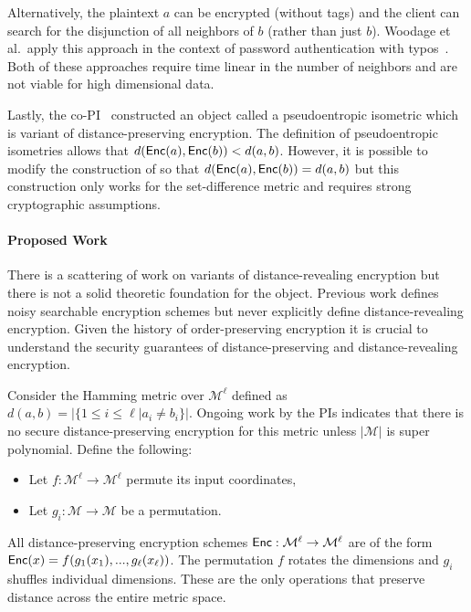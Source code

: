 Alternatively, the plaintext $a$ can be encrypted (without tags) and the client can search for the disjunction of all neighbors of $b$ (rather than just $b$).  Woodage et al.~apply this approach in the context of password authentication with typos~\cite{C:WCDJR17}.  Both of these approaches require time linear in the number of neighbors and are not viable for high dimensional data.

Lastly, the co-PI~\cite{EPRINT:ABCFG16} constructed an object called a pseudoentropic isometric which is variant of distance-preserving encryption.  The definition of pseudoentropic isometries allows that $d(\mathsf{Enc}(a), \mathsf{Enc}(b)) <d(a,b)$.  However, it is possible to modify the construction of \cite{EPRINT:ABCFG16} so that $d(\mathsf{Enc}(a), \mathsf{Enc}(b)) = d(a,b)$ but this construction only works for the set-difference metric and requires strong cryptographic assumptions.

\paragraph{Proposed Work}
There is a scattering of work on variants of distance-revealing encryption but there is not a solid theoretic foundation for the object.  Previous work defines noisy searchable encryption schemes but never explicitly define distance-revealing encryption.   Given the history of order-preserving encryption it is crucial to understand the security guarantees of distance-preserving and distance-revealing encryption. %

Consider the Hamming metric over $\mathcal{M}^\ell$ defined as $d(a,b) = | \{ 1\le i\le \ell | a_i \neq b_i\}|$.  Ongoing work by the PIs indicates that there is no secure distance-preserving encryption for this metric unless $|\mathcal{M}|$ is super polynomial.  Define the following: 
\begin{itemize}\setlength\itemsep{0em}
\item Let $f: \mathcal{M}^\ell \rightarrow \mathcal{M}^\ell$ permute its input coordinates, 
\item Let $g_i: \mathcal{M}\rightarrow \mathcal{M}$ be a permutation.
\end{itemize}
All distance-preserving encryption schemes $\mathsf{Enc}: \mathcal{M}^\ell\rightarrow \mathcal{M}^\ell$ are of the form $\mathsf{Enc}(x) = f(g_1(x_1),..., g_\ell(x_\ell))$.  The permutation $f$ rotates the dimensions and $g_i$ shuffles individual dimensions.  These are the only operations that preserve distance across the entire metric space.

